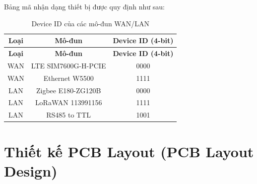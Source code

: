             Bảng mã nhận dạng thiết bị được quy định như sau:
            
            \begin{longtable}{|c|c|c|}
                \caption{Device ID của các mô-đun WAN/LAN} \\
                \hline
                \textbf{Loại} & \textbf{Mô-đun} & \textbf{Device ID (4-bit)} \\
                \hline
                \endfirsthead
                
                \hline
                \textbf{Loại} & \textbf{Mô-đun} & \textbf{Device ID (4-bit)} \\
                \hline
                \endhead
                
                \hline
                \endfoot
                
                \hline
                \endlastfoot
                
                WAN & LTE SIM7600G-H-PCIE & 0000 \\
                \hline                    
                WAN & Ethernet W5500 & 1111 \\
                \hline
                LAN & Zigbee E180-ZG120B & 0000 \\
                \hline
                LAN & LoRaWAN 113991156 & 1111 \\
                \hline
                LAN & RS485 to TTL & 1001 \\
                \hline
            \end{longtable}

    \section{Thiết kế PCB Layout (PCB Layout Design)}
